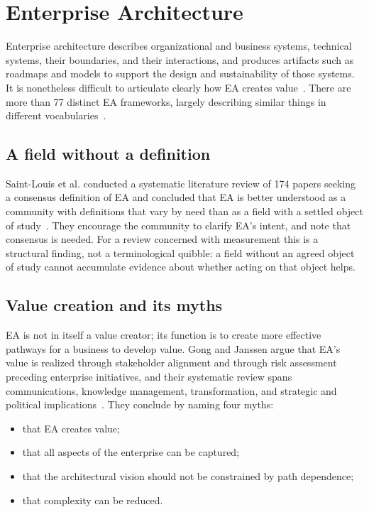 \documentclass[11pt,a4paper]{article}
\begin{document}
\section{Enterprise Architecture}
\label{sec:ea}

Enterprise architecture describes organizational and business systems, technical
systems, their boundaries, and their interactions, and produces artifacts such
as roadmaps and models to support the design and sustainability of those
systems. It is nonetheless difficult to articulate clearly how EA creates
value~\citep{gong2019,saintlouis2017}. There are more than 77 distinct EA
frameworks, largely describing similar things in different
vocabularies~\citep{bente2012}.

\subsection{A field without a definition}

Saint-Louis et al. conducted a systematic literature review of 174 papers
seeking a consensus definition of EA and concluded that EA is better understood
as a community with definitions that vary by need than as a field with a settled
object of study~\citep{saintlouis2017}. They encourage the community to clarify
EA's intent, and note that consensus is needed. For a review concerned with
measurement this is a structural finding, not a terminological quibble: a field
without an agreed object of study cannot accumulate evidence about whether
acting on that object helps.

\subsection{Value creation and its myths}

EA is not in itself a value creator; its function is to create more effective
pathways for a business to develop value. Gong and Janssen argue that EA's value
is realized through stakeholder alignment and through risk assessment preceding
enterprise initiatives, and their systematic review spans communications,
knowledge management, transformation, and strategic and political
implications~\citep{gong2019}. They conclude by naming four myths:

\begin{itemize}
\item that EA creates value;
\item that all aspects of the enterprise can be captured;
\item that the architectural vision should not be constrained by path
dependence;
\item that complexity can be reduced.
\end{itemize}
\end{document}
